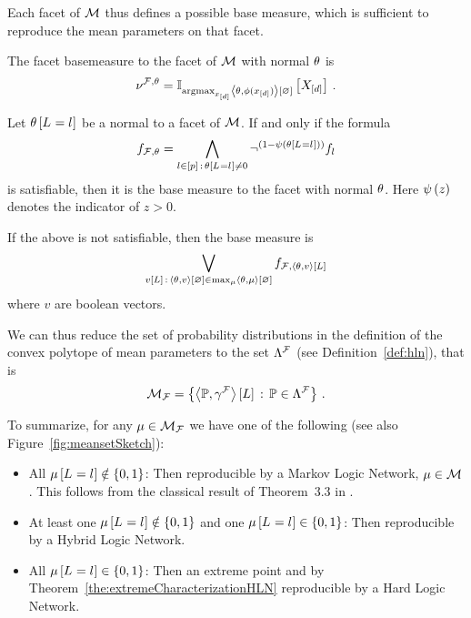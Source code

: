 Each facet of $\mathcal{M}$ thus defines a possible base measure, which is sufficient to reproduce the mean parameters on that facet.

\begin{definition}
	The facet basemeasure to the facet of $\mathcal{M}$ with normal $\theta$ is
		\[ \nu^{\mathcal{F},\theta} = \mathbb{I}_{\mathrm{argmax}_{x_{[d]}} \left\langle \theta,\phi(x_{[d]})\right\rangle \left[ \varnothing \right]}\left[X_{[d]}\right] \, . \]
\end{definition}


\begin{lemma}
	Let $\theta\left[L_{}=l_{}\right]$ be a normal to a facet of $\mathcal{M}$.
	If and only if the formula
		\[ f_{\mathcal{F},\theta} = \bigwedge_{l\in[p] \, : \, \theta\left[L_{}=l_{}\right]\neq0} \lnot^{(1-\psi\left(\theta\left[L_{}=l_{}\right]\right))} f_{l}  \]
	is satisfiable, then it is the base measure to the facet with normal $\theta$.
	Here $\psi\left(z\right)$ denotes the indicator of $z>0$.
	
	If the above is not satisfiable, then the base measure is
		\[ \bigvee_{v[L] \, : \, \left\langle \theta,v\right\rangle \left[ \varnothing \right] \in \max_{\mu} \left\langle \theta,\mu\right\rangle \left[ \varnothing \right] }  f_{\mathcal{F},\left\langle \theta,v\right\rangle \left[ L \right]}  \]
	where $v$ are boolean vectors.
\end{lemma}


We can thus reduce the set of probability distributions in the definition of the convex polytope of mean parameters to the set $\Lambda^{\mathcal{F}}$ (see Definition~\ref{def:hln}), that is
\begin{align*}
	\mathcal{M}_{\mathcal{F}} = \left\{ \left\langle \mathbb{P},\gamma^{\mathcal{F}}\right\rangle \left[ L \right] \, : \, \mathbb{P}\in\Lambda^{\mathcal{F}} \right\} \, .
\end{align*}

To summarize, for any $\mu\in\mathcal{M}_{\mathcal{F}}$ we have one of the following (see also Figure~\ref{fig:meansetSketch}):
\begin{itemize}
	\item All $\mu\left[L_{}=l_{}\right]\notin\{0,1\}$: Then reproducible by a Markov Logic Network, $\mu\in\mathcal{M}$.
		This follows from the classical result of Theorem~3.3 in \cite{wainwright_graphical_2008}.
	\item At least one $\mu\left[L_{}=l_{}\right]\notin\{0,1\}$ and one $\mu\left[L_{}=l_{}\right]\in\{0,1\}$: Then reproducible by a Hybrid Logic Network.
	\item All $\mu\left[L_{}=l_{}\right]\in\{0,1\}$: Then  an extreme point and by Theorem~\ref{the:extremeCharacterizationHLN} reproducible by a Hard Logic Network.
\end{itemize}



